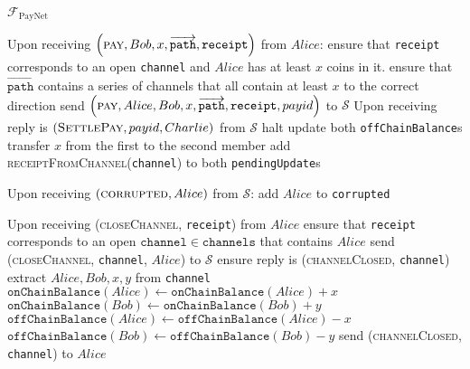 \begin{functionality}{$\mathcal{F}_{\mathrm{PayNet}}$}
\begin{algorithmic}[1]
    \State Upon receiving $\left(\textsc{pay}, Bob, x,
    \overrightarrow{\mathtt{path}}, \mathtt{receipt}\right)$ from $Alice$:
    \Indent
      \State ensure that \texttt{receipt} corresponds to an open
      \texttt{channel} and $Alice$ has at least $x$ coins in it.
      \State ensure that $\overrightarrow{\mathtt{path}}$ contains a series of
      channels that all contain at least $x$ to the correct direction 
      \State send $\left(\textsc{pay}, Alice, Bob, x,
      \overrightarrow{\mathtt{path}}, \mathtt{receipt}, payid\right)$ to $\mathcal{S}$
    \EndIndent
      \State Upon receiving reply is $\left(\textsc{SettlePay}, payid, Charlie\right)$ from $\mathcal{S}$
      \Indent
        \State halt 
      \Else
                \State update both \texttt{offChainBalance}s 
          \State transfer $x$ from the first to the second member 
          \State add \textsc{receiptFromChannel}(\texttt{channel})  to both
          \texttt{pendingUpdate}s
        \EndFor
      \EndIf
    \EndIndent
    \State

    \State Upon receiving $\left(\textsc{corrupted}, Alice\right)$ from
    $\mathcal{S}$:
    \Indent
      \State add $Alice$ to \texttt{corrupted}
    \EndIndent
    \State

    \State Upon receiving (\textsc{closeChannel}, \texttt{receipt}) from $Alice$ 
    \Indent
      \State ensure that \texttt{receipt} corresponds to an open
      $\mathtt{channel} \in \mathtt{channels}$ that contains $Alice$
      \State send (\textsc{closeChannel}, \texttt{channel}, $Alice$) to
      $\mathcal{S}$
      \State ensure reply is (\textsc{channelClosed}, \texttt{channel})
      \State extract $Alice, Bob, x, y$ from \texttt{channel}
      \State $\mathtt{onChainBalance}\left(Alice\right) \gets
      \mathtt{onChainBalance}\left(Alice\right) + x$
      \State {}
      \State $\mathtt{onChainBalance}\left(Bob\right) \gets
      \mathtt{onChainBalance}\left(Bob\right) + y$
      \State $\mathtt{offChainBalance}\left(Alice\right) \gets
      \mathtt{offChainBalance}\left(Alice\right) - x$
      \State $\mathtt{offChainBalance}\left(Bob\right) \gets
      \mathtt{offChainBalance}\left(Bob\right) - y$
      \State send (\textsc{channelClosed}, \texttt{channel}) to $Alice$
    \EndIndent
    \State


\end{algorithmic}
\end{functionality}
